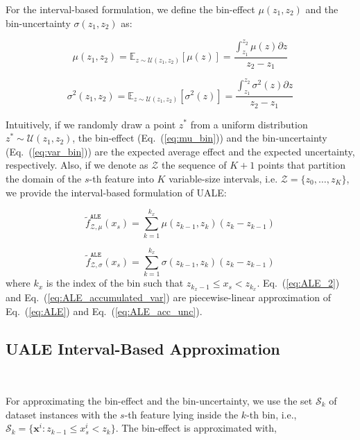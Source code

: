 \documentclass[twoside]{article}
\begin{document}
For the interval-based formulation, we define the bin-effect \(\mu(z_1, z_2)\) and the bin-uncertainty \(\sigma(z_1, z_2)\) as:

\begin{equation}
  \label{eq:mu_bin}
    \mu(z_1, z_2) = \mathbb{E}_{z \sim \mathcal{U}(z_1,z_2)} [\mu(z)]
    = \frac{\int_{z_1}^{z_2} \mu(z) \partial z}{z_2 - z_1}
\end{equation}

\begin{equation}
  \label{eq:var_bin}
  \sigma^2(z_1, z_2) = \mathbb{E}_{z \sim \mathcal{U}(z_1,z_2)} [\sigma^2(z)] =  \frac{\int_{z_1}^{z_2} \sigma^2(z)  \partial z}{z_2 - z_1}
\end{equation}

%
Intuitively, if we randomly draw a point \(z^*\) from a uniform distribution \(z^* \sim \mathcal{U}(z_1, z_2)\), the bin-effect (Eq.~(\ref{eq:mu_bin})) and the bin-uncertainty (Eq.~(\ref{eq:var_bin})) are the expected average effect and the expected uncertainty, respectively. Also, if we denote as \(\mathcal{Z}\) the sequence of \(K+1\) points that partition the domain of the \(s\)-th feature into \(K\) variable-size intervals, i.e.  \(\mathcal{Z} = \{z_0, \ldots, z_K\}\), we provide the interval-based formulation of UALE:

\begin{equation}
  \label{eq:ALE_2}
  \tilde{f}^{\mathtt{ALE}}_{\mathcal{Z}, \mu}(x_s) = \sum_{k=1}^{k_x} \mu(z_{k-1}, z_k) (z_k - z_{k-1})
\end{equation}

\begin{equation}
  \label{eq:ALE_accumulated_var}
  \tilde{f}^{\mathtt{ALE}}_{\mathcal{Z}, \sigma}(x_s) =  \sum_{k=1}^{k_x} \sigma(z_{k-1}, z_k) (z_k - z_{k-1})
\end{equation}
%
where \(k_x\) is the index of the bin such that
\( z_{k_x - 1} \leq x_s < z_{k_x}\). Eq.~(\ref{eq:ALE_2}) and
Eq.~(\ref{eq:ALE_accumulated_var}) are piecewise-linear approximation
of Eq.~(\ref{eq:ALE}) and Eq.~(\ref{eq:ALE_acc_unc}).

\subsection{UALE Interval-Based Approximation}
~\label{sec:UALE-approximation}

For approximating the bin-effect and the bin-uncertainty, we use the
set \(\mathcal{S}_k\) of dataset instances with the \(s\)-th feature
lying inside the \(k\)-th bin, i.e.,
\( \mathcal{S}_k= \{ \mathbf{x}^i : z_{k-1} \leq x^i_s < z_k \}
\). The bin-effect is approximated with,
\end{document}
